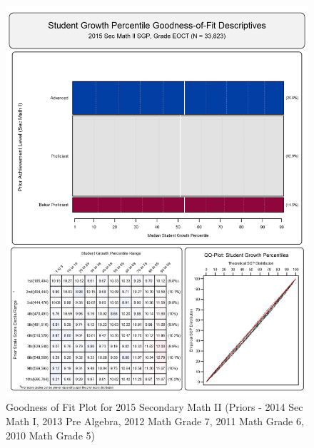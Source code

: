 \documentclass[12pt]{article}
\begin{document}
\begin{figure}[htbp]
\centering
\includegraphics{../img/Goodness_of_Fit/SEC_MATH_II.2015/2015_SEC_MATH_II_EOCT;2014_SEC_MATH_I_EOCT;2013_PRE_ALGEBRA_EOCT;2012_MATH_7;2011_MATH_6;2010_MATH_5.png}
\caption{Goodness of Fit Plot for 2015 Secondary Math II (Priors - 2014
Sec Math I, 2013 Pre Algebra, 2012 Math Grade 7, 2011 Math Grade 6, 2010
Math Grade 5)}
\end{figure}
\end{document}
